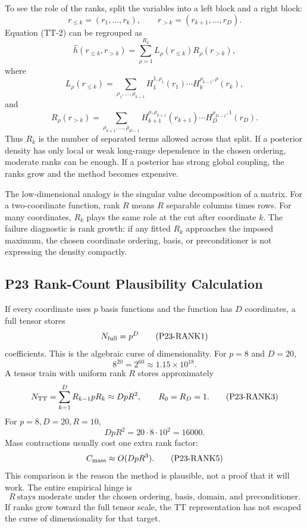 \documentclass[11pt]{article}
\begin{document}
To see the role of the ranks, split the variables into a left block and a right
block:
\[
    r_{\le k}=(r_1,\ldots,r_k),\qquad
    r_{>k}=(r_{k+1},\ldots,r_D).
\]
Equation (TT-2) can be regrouped as
\[
    \widehat h(r_{\le k},r_{>k})
    =
    \sum_{\rho=1}^{R_k}
    L_\rho(r_{\le k})R_\rho(r_{>k}),
    \tag{TT-2a}
\]
where
\[
    L_\rho(r_{\le k})
    =
    \sum_{\rho_1,\ldots,\rho_{k-1}}
    H_1^{1,\rho_1}(r_1)\cdots H_k^{\rho_{k-1},\rho}(r_k),
\]
and
\[
    R_\rho(r_{>k})
    =
    \sum_{\rho_{k+1},\ldots,\rho_{D-1}}
    H_{k+1}^{\rho,\rho_{k+1}}(r_{k+1})\cdots
    H_D^{\rho_{D-1},1}(r_D).
\]
Thus \(R_k\) is the number of separated terms allowed across that split.  If a
posterior density has only local or weak long-range dependence in the chosen
ordering, moderate ranks can be enough.  If a posterior has strong global
coupling, the ranks grow and the method becomes expensive.

The low-dimensional analogy is the singular value decomposition of a matrix.
For a two-coordinate function, rank \(R\) means \(R\) separable columns times
rows.  For many coordinates, \(R_k\) plays the same role at the cut after
coordinate \(k\).  The failure diagnostic is rank growth: if any fitted
\(R_k\) approaches the imposed maximum, the chosen coordinate ordering, basis,
or preconditioner is not expressing the density compactly.

\subsection*{P23 Rank-Count Plausibility Calculation}

If every coordinate uses \(p\) basis functions and the function has \(D\)
coordinates, a full tensor stores
\[
    N_{\rm full}=p^D
    \tag{P23-RANK1}
\]
coefficients.  This is the algebraic curse of dimensionality.  For \(p=8\) and
\(D=20\),
\[
    8^{20}=2^{60}\approx 1.15\times 10^{18}.
    \tag{P23-RANK2}
\]
A tensor train with uniform rank \(R\) stores approximately
\[
    N_{\rm TT}
    =
    \sum_{k=1}^D R_{k-1}pR_k
    \approx DpR^2,
    \qquad R_0=R_D=1.
    \tag{P23-RANK3}
\]
For \(p=8,D=20,R=10\),
\[
    DpR^2=20\cdot 8\cdot 10^2=16000.
    \tag{P23-RANK4}
\]
Mass contractions usually cost one extra rank factor:
\[
    C_{\rm mass}\approx O(DpR^3).
    \tag{P23-RANK5}
\]
This comparison is the reason the method is plausible, not a proof that it
will work.  The entire empirical hinge is
\[
    R\ \text{stays moderate under the chosen ordering, basis, domain, and
    preconditioner.}
    \tag{P23-RANK6}
\]
If ranks grow toward the full tensor scale, the TT representation has not
escaped the curse of dimensionality for that target.
\end{document}
